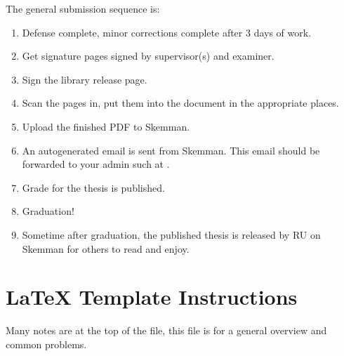 The general submission sequence is:
\begin{enumerate}
\item Defense complete, minor corrections complete after 3 days of work.
\item Get signature pages signed by supervisor(s) and examiner.
\item Sign the library release page.
\item Scan the pages in, put them into the document in the appropriate places.
\item Upload the finished PDF to Skemman.
\item An autogenerated email is sent from Skemman.
  This email should be forwarded to your admin such at \TItvdadmin{}.
\item Grade for the thesis is published.
\item Graduation!
\item Sometime after graduation, the published thesis is released by RU on Skemman for others to read and enjoy.
\end{enumerate}

\section{LaTeX Template Instructions}
Many notes are at the top of the  file, this file
is for a general overview and common problems.

